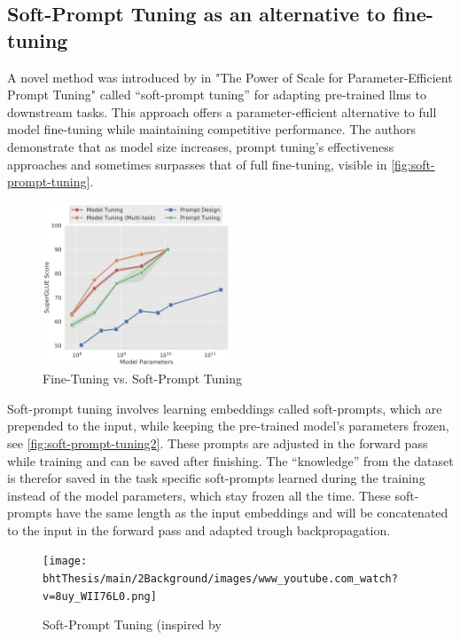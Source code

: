 \subsection{Soft-Prompt Tuning as an alternative to fine-tuning}
\label{subsec:soft-prompt}
A novel method was introduced by \citet{prompt-tuning} in "The Power of Scale for Parameter-Efficient Prompt Tuning" called \enquote{soft-prompt tuning} for adapting pre-trained \acrshort{llms} to downstream tasks. This approach offers a parameter-efficient alternative to full model fine-tuning while maintaining competitive performance. The authors demonstrate that as model size increases, prompt tuning's effectiveness approaches and sometimes surpasses that of full fine-tuning, visible in \autoref{fig:soft-prompt-tuning}. 

\begin{figure}[h]
    \centering
    \includegraphics[width=0.5\textwidth]{bhtThesis/main/2Background/images/soft-prompt-tuning.png}
    \caption{\textcolor{bhtRed}{Fine-Tuning}  vs. \textcolor{bhtGreen}{Soft-Prompt Tuning} \citep{prompt-tuning}}
    \label{fig:soft-prompt-tuning}
\end{figure}



Soft-prompt tuning involves learning embeddings called soft-prompts, which are prepended to the input, while keeping the pre-trained model's parameters frozen, see \autoref{fig:soft-prompt-tuning2}. These prompts are adjusted in the forward pass while training and can be saved after finishing. The \enquote{knowledge} from the dataset is therefor saved in the task specific soft-prompts learned during the training instead of the model parameters, which stay frozen all the time.
These soft-prompts have the same length as the input embeddings and will be concatenated to the input in the forward pass and adapted trough backpropagation. 

\begin{figure}[h]
    \centering
    \texttt{[image: bhtThesis/main/2Background/images/www\_youtube.com\_watch?v=8uy\_WII76L0.png]}
    \caption{Soft-Prompt Tuning (inspired by \citet{youtube-soft-prompt}}
    \label{fig:soft-prompt-tuning2}
\end{figure}

